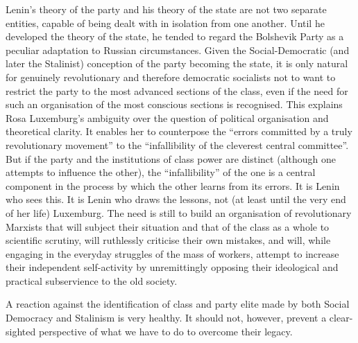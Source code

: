 Lenin's theory of the party and his theory of the state are not two separate entities, capable of being dealt with in isolation from one another. Until he developed the theory of the state, he tended to regard the Bolshevik Party as a peculiar adaptation to Russian circumstances. Given the Social-Democratic (and later the Stalinist) conception of the party becoming the state, it is only natural for genuinely revolutionary and therefore democratic socialists not to want to restrict the party to the most advanced sections of the class, even if the need for such an organisation of the most conscious sections is recognised. This explains Rosa Luxemburg's ambiguity over the question of political organisation and theoretical clarity. It enables her to counterpose the ``errors committed by a truly revolutionary movement'' to the ``infallibility of the cleverest central committee''. But if the party and the institutions of class power are distinct (although one attempts to influence the other), the ``infallibility'' of the one is a central component in the process by which the other learns from its errors. It is Lenin who sees this. It is Lenin who draws the lessons, not (at least until the very end of her life) Luxemburg. The need is still to build an organisation of revolutionary Marxists that will subject their situation and that of the class as a whole to scientific scrutiny, will ruthlessly criticise their own mistakes, and will, while engaging in the everyday struggles of the mass of workers, attempt to increase their independent self-activity by unremittingly opposing their ideological and practical subservience to the old society.

A reaction against the identification of class and party elite made by both Social Democracy and Stalinism is very healthy. It should not, however, prevent a clear-sighted perspective of what we have to do to overcome their legacy.
